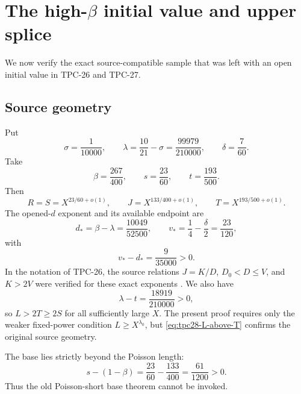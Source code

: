 \section{The high-\texorpdfstring{\(\beta\)}{beta} initial value and upper splice}
\label{sec:tpc28-high-splice}

We now verify the exact source-compatible sample that was left with an
open initial value in TPC-26 and TPC-27.

\subsection{Source geometry}

Put
\begin{equation}
 \sigma=\frac1{10000},\qquad
 \lambda=\frac{10}{21}-\sigma
 =\frac{99979}{210000},\qquad
 \delta=\frac7{60}.
 \label{eq:tpc28-source-parameters}
\end{equation}
Take
\begin{equation}
 \beta=\frac{267}{400},\qquad
 s=\frac{23}{60},\qquad
 t=\frac{193}{500}.
 \label{eq:tpc28-high-sample}
\end{equation}
Then
\begin{equation}
 R=S=X^{23/60+o(1)},\qquad
 J=X^{133/400+o(1)},\qquad
 T=X^{193/500+o(1)}.
 \label{eq:tpc28-high-scales}
\end{equation}
The opened-$d$ exponent and its available endpoint are
\begin{equation}
 d_*=\beta-\lambda=\frac{10049}{52500},
 \qquad
 v_*=\frac14-\frac\delta2=\frac{23}{120},
 \label{eq:tpc28-dv-exponents}
\end{equation}
with
\begin{equation}
 v_*-d_*=\frac9{35000}>0.
 \label{eq:tpc28-dv-margin}
\end{equation}
In the notation of TPC-26, the source relations
$J=K/D$, $D_0<D\le V$, and $K>2V$ were verified for these exact
exponents \citep{WangTPC26}.  We also have
\begin{equation}
 \lambda-t=\frac{18919}{210000}>0,
 \label{eq:tpc28-L-above-T}
\end{equation}
so $L>2T\ge2S$ for all sufficiently large $X$.  The present proof
requires only the weaker fixed-power condition $L\ge X^{\lambda_0}$,
but \eqref{eq:tpc28-L-above-T} confirms the original source geometry.

The base lies strictly beyond the Poisson length:
\begin{equation}
 s-(1-\beta)
 =\frac{23}{60}-\frac{133}{400}
 =\frac{61}{1200}>0.
 \label{eq:tpc28-base-beyond-J}
\end{equation}
Thus the old Poisson-short base theorem cannot be invoked.

